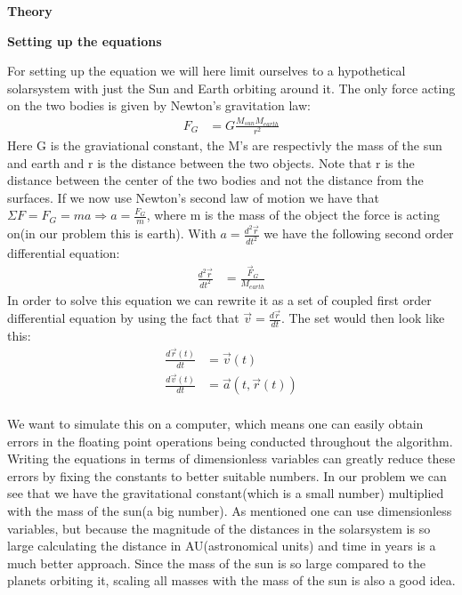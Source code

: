 \documentclass[11 pt, a4 paper]{article}
\newenvironment{tabbed}{\begin{addmargin}{0.1cm}}{\end{addmargin}}
\newcommand{\sectiontitle}[1]{\begin{center} \Large\textbf{{#1}} \end{center}}
\newcommand{\sectionundertitle}[1]{\hspace{-0.5cm} \textbf{{#1}}}
\newcommand{\vsp}{\vspace{0.2cm}}
\begin{document}
\sectiontitle{Theory}
\sectionundertitle{Setting up the equations}
    \begin{tabbed}
        For setting up the equation we will here limit ourselves to a hypothetical solarsystem with just the Sun and Earth orbiting around it. The only force acting on the two bodies is given by Newton's gravitation law:
        \begin{align*}
            F_G &= G\frac{M_{sun}M_{earth}}{r^2}
        \end{align*}
        Here G is the graviational constant, the M's are respectivly the mass of the sun and earth and r is the distance between the two objects. Note that r is the distance between the center of the two bodies and not the distance from the surfaces. If we now use Newton's second law of motion we have that $\Sigma F = F_G = ma \Rightarrow a = \frac{F_G}{m}$, where m is the mass of the object the force is acting on(in our problem this is earth). With $a=\frac{d^2\vec{r}}{dt^2}$ we have the following second order differential equation:
        \begin{align*}
            \frac{d^2\vec{r}}{dt^2} &= \frac{\vec{F}_G}{M_{earth}}
        \end{align*}
        In order to solve this equation we can rewrite it as a set of coupled first order differential equation by using the fact that $\vec{v}=\frac{d\vec{r}}{dt}$. The set would then look like this:
        \begin{align*}
            \frac{d\vec{r}(t)}{dt} &= \vec{v}(t)\\
            \frac{d\vec{v}(t)}{dt} &= \vec{a}(t,\vec{r}(t))
        \end{align*}\vsp\\
        We want to simulate this on a computer, which means one can easily obtain errors in the floating point operations being conducted throughout the algorithm. Writing the equations in terms of dimensionless variables can greatly reduce these errors by fixing the constants to better suitable numbers. In our problem we can see that we have the gravitational constant(which is a small number) multiplied with the mass of the sun(a big number). As mentioned one can use dimensionless variables, but because the magnitude of the distances in the solarsystem is so large calculating the distance in AU(astronomical units) and time in years is a much better approach. Since the mass of the sun is so large compared to the planets orbiting it, scaling all masses with the mass of the sun is also a good idea.\vsp\\

\end{tabbed}
\end{document}
